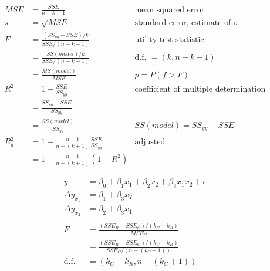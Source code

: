 \documentclass[12pt, landscape]{article}
\begin{document}
\begin{multicols}{2}

\begin{align*}
    MSE &= \frac{SSE}{n - k - 1} &\text{mean squared error} \\
    s &= \sqrt{MSE} &\text{standard error, estimate of }\sigma \\
    F &= \frac{(SS_{yy} - SSE) / k}{SSE / (n - k - 1)} &\text{utility test statistic} \\
      &= \frac{SS(model)/k}{SSE / (n - k - 1)} &\text{d.f. } = (k, n - k - 1) \\
      &= \frac{MS(model)}{MSE} & p = P(f > F) \\
    R^2 &= 1 - \frac{SSE}{SS_{yy}} &\text{coefficient of multiple determination} \\
        &= \frac{SS_{yy}-SSE}{SS_{yy}} \\
        &= \frac{SS(model)}{SS_{yy}} & SS(model) = SS_{yy} - SSE\\
    R_a^2 &= 1 - \frac{n-1}{n-(k+1)} \frac{SSE}{SS_{yy}} &\text{adjusted} \\
          &= 1 - \frac{n-1}{n-(k+1)} (1 - R^2)
\end{align*}

\vfill\null
\columnbreak

\begin{align*}
    y &= \beta_0 + \beta_1 x_1 + \beta_2 x_2 + \beta_3 x_1 x_2 + \epsilon \\
    \Delta \bar{y}_{x_1} &= \beta_1 + \beta_3 x_2 \\
    \Delta \bar{y}_{x_2} &= \beta_2 + \beta_3 x_1 \\
    \\
    F &= \frac{(SSE_R - SSE_C)/(k_C - k_R)}{MSE_C} \\
      &= \frac{(SSE_R - SSE_C)/(k_C - k_R)}{SSE_C/(n-(k_C+1))}\\
    \text{d.f.} &= (k_C - k_R, n-(k_C+1))
\end{align*}

\end{multicols}
\end{document}
